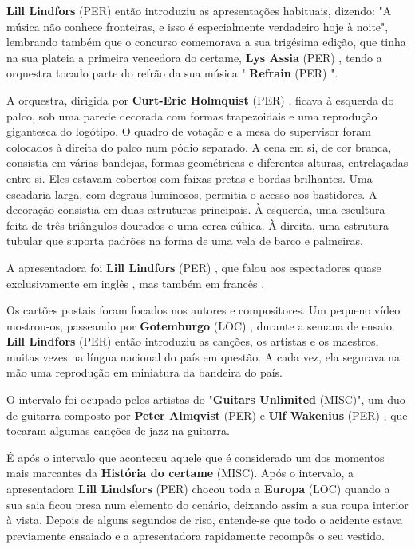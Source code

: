 \documentclass[12pt,a4paper]{article}
\begin{document}
\textbf{Lill Lindfors} (PER) então introduziu as apresentações habituais, dizendo: "A música não conhece fronteiras, e isso é especialmente verdadeiro hoje à noite", lembrando também que o concurso comemorava a sua trigésima edição, que tinha na sua plateia a primeira vencedora do certame, \textbf{Lys Assia} (PER) , tendo a orquestra tocado parte do refrão da sua música " \textbf{Refrain} (PER) ".

A orquestra, dirigida por \textbf{Curt-Eric Holmquist} (PER) , ficava à esquerda do palco, sob uma parede decorada com formas trapezoidais e uma reprodução gigantesca do logótipo. O quadro de votação e a mesa do supervisor foram colocados à direita do palco num pódio separado. A cena em si, de cor branca, consistia em várias bandejas, formas geométricas e diferentes alturas, entrelaçadas entre si. Eles estavam cobertos com faixas pretas e bordas brilhantes. Uma escadaria larga, com degraus luminosos, permitia o acesso aos bastidores. A decoração consistia em duas estruturas principais. À esquerda, uma escultura feita de três triângulos dourados e uma cerca cúbica. À direita, uma estrutura tubular que suporta padrões na forma de uma vela de barco e palmeiras.

A apresentadora foi \textbf{Lill Lindfors} (PER) , que falou aos espectadores quase exclusivamente em inglês , mas também em francês .

Os cartões postais foram focados nos autores e compositores. Um pequeno vídeo mostrou-os, passeando por \textbf{Gotemburgo} (LOC) , durante a semana de ensaio. \textbf{Lill Lindfors} (PER) então introduziu as canções, os artistas e os maestros, muitas vezes na língua nacional do país em questão. A cada vez, ela segurava na mão uma reprodução em miniatura da bandeira do país.

O intervalo foi ocupado pelos artistas do "\textbf{Guitars Unlimited} (MISC)", um duo de guitarra composto por \textbf{Peter Almqvist} (PER) e \textbf{Ulf Wakenius} (PER) , que tocaram algumas canções de jazz na guitarra.

É após o intervalo que aconteceu aquele que é considerado um dos momentos mais marcantes da \textbf{História do certame} (MISC). Após o intervalo, a apresentadora \textbf{Lill Lindsfors} (PER) chocou toda a \textbf{Europa} (LOC) quando a sua saia ficou presa num elemento do cenário, deixando assim a sua roupa interior à vista. Depois de alguns segundos de riso, entende-se que todo o acidente estava previamente ensaiado e a apresentadora rapidamente recompôs o seu vestido.
\end{document}
